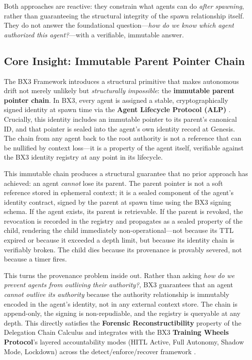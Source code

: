Both approaches are reactive: they constrain what agents can do \emph{after spawning}, rather than guaranteeing the structural integrity of the spawn relationship itself. They do not answer the foundational question—\emph{how do we know which agent authorized this agent?}—with a verifiable, immutable answer.

\subsection{Core Insight: Immutable Parent Pointer Chain}

The BX3 Framework introduces a structural primitive that makes autonomous drift not merely unlikely but \emph{structurally impossible}: the \textbf{immutable parent pointer chain}. In BX3, every agent is assigned a stable, cryptographically signed identity at spawn time via the \textbf{Agent Lifecycle Protocol (ALP)} \cite{alp2025agentlifecycleprotocol}. Crucially, this identity includes an immutable pointer to its parent's canonical ID, and that pointer is sealed into the agent's own identity record at Genesis. The chain from any agent back to the root authority is not a reference that can be nullified by context loss—it is a property of the agent itself, verifiable against the BX3 identity registry at any point in its lifecycle.

This immutable chain produces a structural guarantee that no prior approach has achieved: an agent \emph{cannot} lose its parent. The parent pointer is not a soft reference stored in ephemeral context; it is a sealed component of the agent's identity contract, signed by the parent at spawn time using the BX3 signing schema. If the agent exists, its parent is retrievable. If the parent is revoked, the revocation is recorded in the registry and propagates as a sealed property of the child, rendering the child immediately non-operational—not because its TTL expired or because it exceeded a depth limit, but because its identity chain is verifiably broken. The child dies because its provenance is provably severed, not because a timer fires.

This turns the provenance problem inside out. Rather than asking \emph{how do we prevent agents from outliving their authority?}, BX3 guarantees that an agent \emph{cannot outlive its authority} because the authority relationship is immutably encoded in the agent's identity, not in any external context store. The chain is append-only, the signing is non-repudiable, and the registry is queryable at any depth. This directly satisfies the \textbf{Forensic Reconstructibility} property of the Delegation Chain Calculus \cite{sentinelagent2025sentinel} and integrates with the BX3 \textbf{Training Wheels Protocol}'s layered accountability modes (HITL Active, Full Autonomy, Shadow Mode, Lockdown) across the detect/enforce/recover framework \cite{auditableagents2025}.

